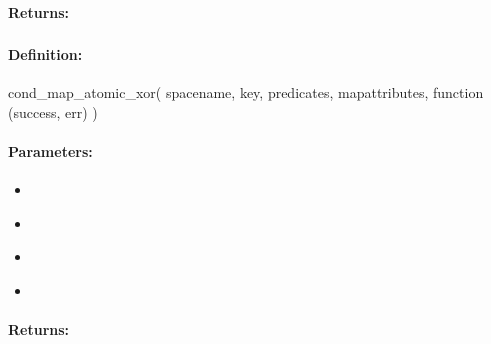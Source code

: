 \paragraph{Returns:}


\pagebreak
\subsubsection{}
\label{api:nodejs:cond_map_atomic_xor}


\paragraph{Definition:}
\begin{javascriptcode}
cond_map_atomic_xor(
        spacename, key, predicates, mapattributes, function (success, err) {})
\end{javascriptcode}
\paragraph{Parameters:}
\begin{itemize}[noitemsep]
\item {}\\

\item {}\\

\item {}\\

\item {}\\

\end{itemize}

\paragraph{Returns:}


\pagebreak
\subsubsection{}
\label{api:nodejs:map_string_prepend}


